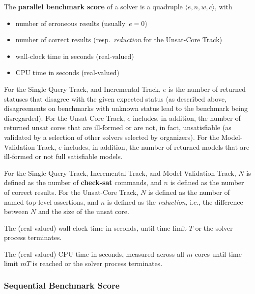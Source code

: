 \documentclass[12pt]{article}
\newcommand{\akey}[1]{\textbf{#1}\xspace}
\newcommand{\maintrack}{Single Query Track\xspace}
\newcommand{\inctrack}{Incremental Track\xspace}
\newcommand{\ucoretrack}{Unsat-Core Track\xspace}
\newcommand{\mvaltrack}{Model-Validation Track\xspace}
\newcommand{\challtrack}{Industry-Challenge Track\xspace}
\begin{document}
The \textbf{parallel benchmark score} of a solver is a quadruple $\langle
e, n, w, c\rangle$, with
\begin{itemize}[noitemsep]
  \vspace{-1ex}
  \item {}
    number of erroneous results (usually~$e = 0$)
  \item {}
    number of correct results (resp.~\emph{reduction} for the \ucoretrack)
  \item {}
    wall-clock time in seconds (real-valued)
  \item {}
    CPU time in seconds (real-valued)
\end{itemize}

For the \maintrack, and \inctrack,%
$e$ is the number of returned
statuses that disagree with the given expected status (as described above,
disagreements on benchmarks with unknown status lead to the benchmark being
disregarded). For the \ucoretrack, $e$ includes, in addition, the number of
returned unsat cores that are ill-formed or are not, in fact, unsatisfiable (as
validated by a selection of other solvers selected by organizers).  For the
\mvaltrack, $e$ includes, in addition, the number of returned models that are
ill-formed or not full satisfiable models.

For the \maintrack, \inctrack, and \mvaltrack,
$N$ is defined as the number of \akey{check-sat} commands, and
$n$ is defined as the number of correct results.
For the \ucoretrack, $N$ is defined as the number of named top-level assertions,
and $n$ is defined as the \emph{reduction}, i.e., the difference between $N$
and the size of the unsat core.

The (real-valued) wall-clock time in seconds, until time limit $T$ or the
solver process terminates.

The (real-valued) CPU time in seconds, measured across all $m$ cores
until time limit $mT$ is reached or the solver process
terminates.

\subsubsection{Sequential Benchmark Score}
\label{sec:sequential}
\end{document}
